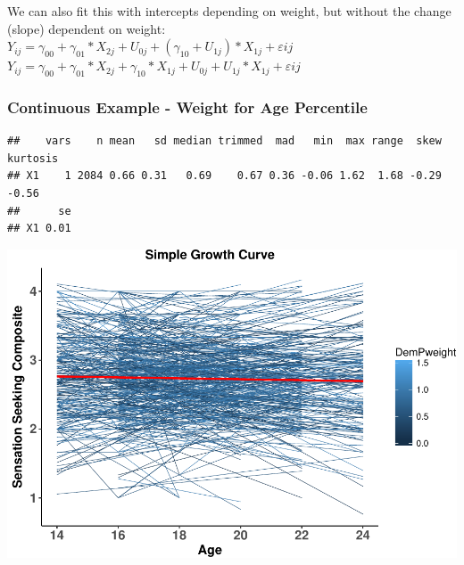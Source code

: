 \documentclass[]{article}
\newenvironment{Shaded}{\begin{snugshade}}{\end{snugshade}}
\newcommand{\KeywordTok}[1]{\textcolor[rgb]{0.13,0.29,0.53}{\textbf{#1}}}
\newcommand{\OperatorTok}[1]{\textcolor[rgb]{0.81,0.36,0.00}{\textbf{#1}}}
\newcommand{\NormalTok}[1]{#1}
\begin{document}
We can also fit this with intercepts depending on weight, but without
the change (slope) dependent on weight:\\
\(Y_{ij} = \gamma_{00} + \gamma_{01}*X_{2j} + U_{0j} + (\gamma_{10} + U_{1j})*X_{1j} + \varepsilon{ij}\)
\(Y_{ij} = \gamma_{00} + \gamma_{01}*X_{2j} + \gamma_{10}*X_{1j} + U_{0j} + U_{1j}*X_{1j} + \varepsilon{ij}\)

\subsubsection{Continuous Example - Weight for Age
Percentile}\label{continuous-example---weight-for-age-percentile}

\small

\begin{Shaded}
\end{Shaded}

\begin{verbatim}
##    vars    n mean   sd median trimmed  mad   min  max range  skew kurtosis
## X1    1 2084 0.66 0.31   0.69    0.67 0.36 -0.06 1.62  1.68 -0.29    -0.56
##      se
## X1 0.01
\end{verbatim}

\normalsize

\includegraphics{Conditional_Models_doc_files/figure-latex/unnamed-chunk-7-1.pdf}

\small
\end{document}
